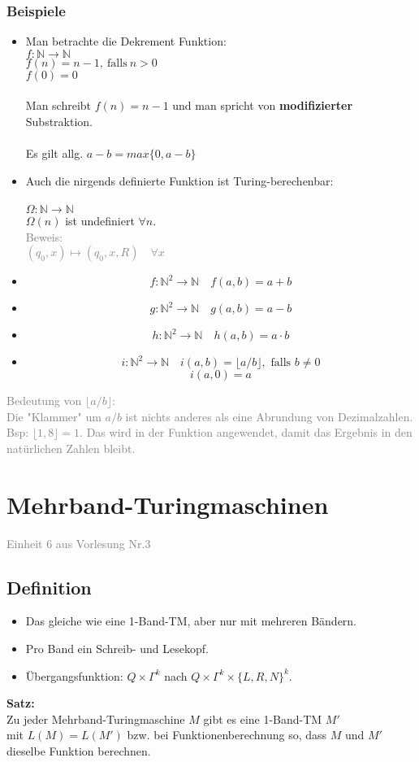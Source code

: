 \documentclass{article}
\begin{document}
		\subsubsection{Beispiele}
		\begin{itemize}
			\item Man betrachte die Dekrement Funktion: \\
			$f: \mathbb{N} \rightarrow \mathbb{N}$ \\
			$f(n) = n - 1, \: \text{falls} \: n > 0$ \\
			$f(0) = 0$ \\
			\\
			Man schreibt $f(n) = n - 1$ und man spricht von \textbf{modifizierter} Substraktion. \\
			\\
			Es gilt allg. $a - b = max\{0, a-b\}$ 
			\item Auch die nirgends definierte Funktion ist Turing-berechenbar: \\
			\\
			$\Omega: \mathbb{N} \rightarrow \mathbb{N}$ \\
			$\Omega(n)$ ist undefiniert $\forall n$. \\
			\textcolor{gray}{Beweis: \\
				$(q_0, x) \mapsto (q_0, x, R) \quad \forall x$
			}
			\item \[f: \mathbb{N}^2 \rightarrow \mathbb{N} \quad f(a,b) = a+b\]
			\item \[g: \mathbb{N}^2 \rightarrow \mathbb{N} \quad g(a,b) = a-b\]
			\item \[h: \mathbb{N}^2 \rightarrow \mathbb{N} \quad h(a,b) = a\cdot b\]
			\item \[i: \mathbb{N}^2 \rightarrow \mathbb{N} \quad i(a,b) = \lfloor a / b \rfloor, \text{ falls } b \neq 0\]
			\[i(a,0) = a\]
		\end{itemize}
		\textcolor{gray}{Bedeutung von $\lfloor a/b \rfloor$: \\
			Die "Klammer" um $a/b$ ist nichts anderes als eine Abrundung von Dezimalzahlen. Bsp: $\lfloor 1,8 \rfloor = 1$. Das wird in der Funktion angewendet, damit das Ergebnis in den natürlichen Zahlen bleibt.
		}
		\section{Mehrband-Turingmaschinen}
		\textcolor{gray}{Einheit 6 aus Vorlesung Nr.3}
		\subsection{Definition}
		\begin{itemize}
			\item Das gleiche wie eine 1-Band-TM, aber nur mit mehreren Bändern.
			\item Pro Band ein Schreib- und Lesekopf.
			\item Übergangsfunktion: $Q \times \Gamma^k$ nach $Q \times \Gamma^k \times \{L,R,N\}^k$. 
		\end{itemize}
		\textbf{Satz: } \\
		Zu jeder Mehrband-Turingmaschine $M$ gibt es eine 1-Band-TM $M'$\\ mit $L(M) = L(M')$ bzw. bei Funktionenberechnung so, dass $M$ und $M'$ dieselbe Funktion berechnen.
\end{document}
